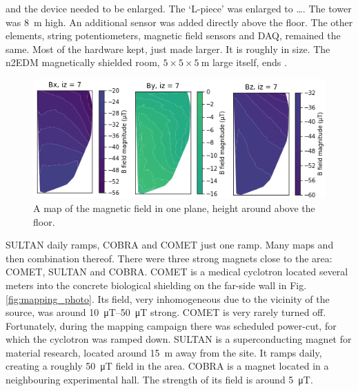 and the device needed to be enlarged.
The `L-piece' was enlarged to \ldots.
The tower was \SI{8}{\metre} high.
An additional sensor was added directly above the floor.
The other elements, string potentiometers, magnetic field sensors and DAQ, remained the same.
Most of the hardware kept, just made larger.
It is roughly  in size.
The n2EDM magnetically shielded room, $5 \times 5 \times \SI{5}{\metre}$ large itself, ends .

\begin{figure}
  \centering
  \includegraphics[width=\linewidth]{gfx/mapping/nSnCobCom.png}
  \caption{A map of the magnetic field in one plane, height around  above the floor.
  }\label{fig:mapping_p-i_map}
\end{figure}

SULTAN daily ramps, COBRA and COMET just one ramp.
Many maps and then combination thereof.
There were three strong magnets close to the area: COMET, SULTAN and COBRA\@.
COMET is a medical cyclotron located several meters into the concrete biological shielding on the far-side wall in Fig.\,\ref{fig:mapping_photo}.
Its field, very inhomogeneous due to the vicinity of the source, was around \SIrange[range-phrase=--,range-units=single]{10}{50}{\micro\tesla} strong.
COMET is very rarely turned off.
Fortunately, during the mapping campaign there was scheduled power-cut, for which the cyclotron was ramped down.
SULTAN is a superconducting magnet for material research, located around \SI{15}{\metre} away from the site.
It ramps daily, creating a roughly \SI{50}{\micro\tesla} field in the area.
COBRA is a magnet located in a neighbouring experimental hall.
The strength of its field is around \SI{5}{\micro\tesla}.

